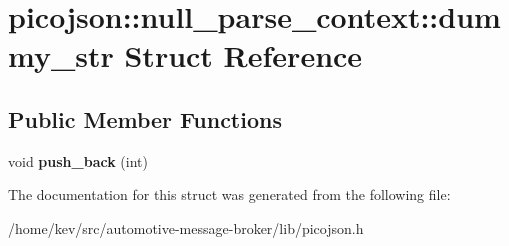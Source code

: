 \hypertarget{structpicojson_1_1null__parse__context_1_1dummy__str}{\section{picojson\+:\+:null\+\_\+parse\+\_\+context\+:\+:dummy\+\_\+str Struct Reference}
\label{structpicojson_1_1null__parse__context_1_1dummy__str}
}
\subsection*{Public Member Functions}
\begin{DoxyCompactItemize}
\item 
\hypertarget{structpicojson_1_1null__parse__context_1_1dummy__str_ac2b5c5eca1014b268b4c5a2a87d8923c}{void {\bfseries push\+\_\+back} (int)}\label{structpicojson_1_1null__parse__context_1_1dummy__str_ac2b5c5eca1014b268b4c5a2a87d8923c}

\end{DoxyCompactItemize}


The documentation for this struct was generated from the following file\+:\begin{DoxyCompactItemize}
\item 
/home/kev/src/automotive-\/message-\/broker/lib/picojson.\+h\end{DoxyCompactItemize}
